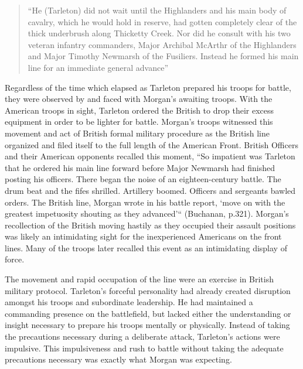 \begin{quote}
  “He (Tarleton) did not wait until the Highlanders and his main body of
  cavalry, which he would hold in reserve, had gotten completely clear of the
  thick underbrush along Thicketty Creek.  Nor did he consult with his two
  veteran infantry commanders, Major Archibal McArthr of the Highlanders and
  Major Timothy Newmarsh of the Fusiliers.  Instead he formed his main line for
  an immediate general advance” \cite[p.321]{buchanan_road_1997}
\end{quote}


Regardless of the time which elapsed as Tarleton prepared his troops for battle,
they were observed by and faced with Morgan’s awaiting troops.  With the
American troops in sight, Tarleton ordered the British to drop their excess
equipment in order to be lighter for battle.  Morgan’s troops witnessed this
movement and act of British formal military procedure as the British line
organized and filed itself to the full length of the American Front.  British
Officers and their American opponents recalled this moment, “So impatient was
Tarleton that he ordered his main line forward before Major Newmarsh had
finished posting his officers.  There began the noise of an eighteen-century
battle.  The drum beat and the fifes shrilled.  Artillery boomed.  Officers and
sergeants bawled orders.  The British line, Morgan wrote in his battle report,
‘move on with the greatest impetuosity shouting as they advanced’“ (Buchanan,
p.321).   Morgan’s recollection of the British moving hastily as they occupied
their assault positions was likely an intimidating sight for the inexperienced
Americans on the front lines.   Many of the troops later recalled this event as
an intimidating display of force.

The movement and rapid occupation of the line were an exercise in British
military protocol.  Tarleton's forceful personality had already created
disruption amongst his troops and subordinate leadership.  He had maintained a
commanding presence on the battlefield, but lacked either the understanding or
insight necessary to prepare his troops mentally or physically.  Instead of
taking the precautions necessary during a deliberate attack, Tarleton's actions
were impulsive.  This impulsiveness and rush to battle without taking the
adequate precautions necessary was exactly what Morgan was expecting.


